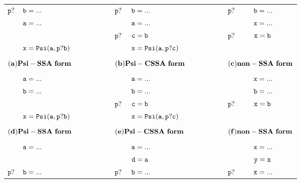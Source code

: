 \begin{figure*}
\begin{center}
\footnotesize
\begin{tabular}{llllllll}
${\tt p?}$  & ${\tt b = ...}$ & \ \ \ \ \ \ \ \  & ${\tt p?}$ & ${\tt b = ...}$ & \ \ \ \ \ \ \ \  & ${\tt p?}$ & ${\tt b = ...}$ \\
            & ${\tt a = ...}$ & \ \ \ \ \ \ \ \  &            & ${\tt a = ...}$ & \ \ \ \ \ \ \ \  &            & ${\tt x = ...}$ \\
            &                 & \ \ \ \ \ \ \ \  & ${\tt p?}$ & ${\tt c = b}$   & \ \ \ \ \ \ \ \  & ${\tt p?}$ & ${\tt x = b}$ \\
            & ${\tt x = Psi(a,p?b)}$ & \ \ \ \ \ \ \ \  &     & ${\tt x = Psi(a,p?c)}$  & \ \ \ \ \ \ \ \ &     & \\
\\
\multicolumn{2}{l}{${\tt {\bf (a) Psi-SSA\ form}}$} & \ \ \ \ \ \ \ \  &\multicolumn{2}{l}{${\tt {\bf (b) Psi-CSSA\ form}}$} & \ \ \ \ \ \ \ \  &\multicolumn{2}{l}{${\tt {\bf (c) non-SSA\ form}}$} \\
\\
            & ${\tt a = ...}$ & \ \ \ \ \ \ \ \  &            & ${\tt a = ...}$ & \ \ \ \ \ \ \ \  &            & ${\tt x = ...}$ \\
            & ${\tt b = ...}$ & \ \ \ \ \ \ \ \  &            & ${\tt b = ...}$ & \ \ \ \ \ \ \ \  &            & ${\tt b = ...}$ \\
            &                 & \ \ \ \ \ \ \ \  & ${\tt p?}$ & ${\tt c = b}$   & \ \ \ \ \ \ \ \  & ${\tt p?}$ & ${\tt x = b}$ \\
            & ${\tt x = Psi(a,p?b)}$ & \ \ \ \ \ \ \ \  &     & ${\tt x = Psi(a,p?c)}$  & \ \ \ \ \ \ \ \ &     & \\
\\
\multicolumn{2}{l}{${\tt {\bf (d) Psi-SSA\ form}}$} & \ \ \ \ \ \ \ \  &\multicolumn{2}{l}{${\tt {\bf (e) Psi-CSSA\ form}}$} & \ \ \ \ \ \ \ \  &\multicolumn{2}{l}{${\tt {\bf (f) non-SSA\ form}}$} \\
\\
            & ${\tt a = ...}$ & \ \ \ \ \ \ \ \  &            & ${\tt a = ...}$ & \ \ \ \ \ \ \ \  &            & ${\tt x = ...}$ \\
            &                 & \ \ \ \ \ \ \ \  &            & ${\tt d = a}$ & \ \ \ \ \ \ \ \  &            & ${\tt y = x}$ \\
${\tt p?}$  & ${\tt b = ...}$ & \ \ \ \ \ \ \ \  & ${\tt p?}$ & ${\tt b = ...}$ & \ \ \ \ \ \ \ \  & ${\tt p?}$ & ${\tt x = ...}$ \\

\end{tabular}
\end{center}
\end{figure*}
